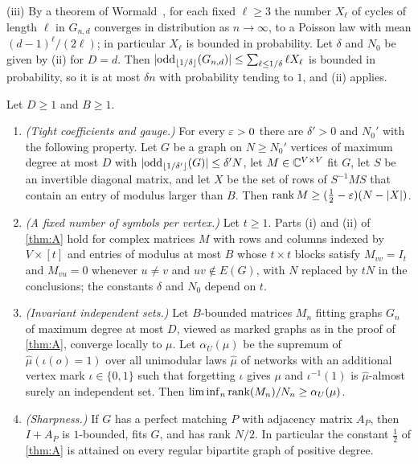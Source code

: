 \begin{informalproof}
(iii) By a theorem of Wormald~\cite{Wormald1981}, for each fixed $\ell\ge3$ the number $X_\ell$ of cycles of length
$\ell$ in $G_{n,d}$ converges in distribution as $n\to\infty$, to a Poisson law with mean $(d-1)^\ell/(2\ell)$; in
particular $X_\ell$ is bounded in probability. Let $\delta$ and $N_0$ be given by (ii) for $D=d$. Then
$\lvert \mathrm{odd}_{\lfloor1/\delta\rfloor}(G_{n,d}) \rvert\le\sum_{\ell\le1/\delta}\ell X_\ell$ is bounded in probability,
so it is at most $\delta n$ with probability tending to $1$, and (ii) applies.
\end{informalproof}

\begin{proposition}\label{prop:ana-A-ext}
\notformalized
Let $D\ge1$ and $B\ge1$.
\begin{enumerate}[label=(\alph*)]
\item \emph{(Tight coefficients and gauge.)} For every $\varepsilon>0$ there are $\delta'>0$ and $N_0'$ with the following
  property. Let $G$ be a graph on $N\ge N_0'$ vertices of maximum degree at most $D$ with
  $\lvert \mathrm{odd}_{\lfloor1/\delta'\rfloor}(G) \rvert\le\delta'N$, let $M\in\mathbb{C}^{V\times V}$ fit $G$, let $S$ be an
  invertible diagonal matrix, and let $X$ be the set of rows of $S^{-1}MS$ that contain an entry of modulus larger than
  $B$. Then $\operatorname{rank} M\ge(\frac12-\varepsilon)(N-\lvert X \rvert)$.
\item \emph{(A fixed number of symbols per vertex.)} Let $t\ge1$. Parts (i) and (ii) of \cref{thm:A} hold for complex
  matrices $M$ with rows and columns indexed by $V\times[t]$ and entries of modulus at most $B$ whose $t\times t$ blocks
  satisfy $M_{vv}=I_t$ and $M_{vu}=0$ whenever $u\ne v$ and $uv\notin E(G)$, with $N$ replaced by $tN$ in the
  conclusions; the constants $\delta$ and $N_0$ depend on $t$.
\item \emph{(Invariant independent sets.)} Let $B$-bounded matrices $M_n$ fitting graphs $G_n$ of maximum degree at most
  $D$, viewed as marked graphs as in the proof of \cref{thm:A}, converge locally to $\mu$. Let $\alpha_U(\mu)$ be the
  supremum of $\hat\mu(\iota(o)=1)$ over all unimodular laws $\hat\mu$ of networks with an additional vertex mark
  $\iota\in\{0,1\}$ such that forgetting $\iota$ gives $\mu$ and $\iota^{-1}(1)$ is $\hat\mu$-almost surely an
  independent set. Then $\liminf_n\operatorname{rank}(M_n)/N_n\ge\alpha_U(\mu)$.
\item \emph{(Sharpness.)} If $G$ has a perfect matching $P$ with adjacency matrix $A_P$, then $I+A_P$ is $1$-bounded,
  fits $G$, and has rank $N/2$. In particular the constant $\frac12$ of \cref{thm:A} is attained on every regular
  bipartite graph of positive degree.
\end{enumerate}
\end{proposition}

